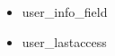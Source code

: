 \documentclass[a4paper, 14pt]{extarticle}
\begin{document}
\begin{itemize}
\begin{itemize}
      \item user\_info\_field
      \item user\_lastaccess

\end{itemize}
\end{itemize}
\end{document}
